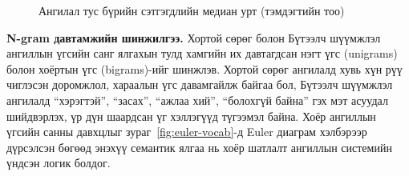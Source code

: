 \begin{figure}[H]
\centering
{}
\caption{Ангилал тус бүрийн сэтгэгдлийн медиан урт (тэмдэгтийн тоо)}
\label{fig:len-dist}
\end{figure}

\textbf{N-gram давтамжийн шинжилгээ.} Хортой сөрөг болон Бүтээлч шүүмжлэл
ангиллын үгсийн санг ялгахын тулд хамгийн их давтагдсан нэгт үгс (unigrams) болон
хоёртын үгс (bigrams)-ийг шинжлэв. Хортой сөрөг ангилалд хувь хүн рүү чиглэсэн
доромжлол, хараалын үгс давамгайлж байгаа бол, Бүтээлч шүүмжлэл ангилалд ``хэрэгтэй'',
``засах'', ``ажлаа хий'', ``болохгүй байна'' гэх мэт асуудал шийдвэрлэх, үр дүн
шаардсан үг хэллэгүүд түгээмэл байна. Хоёр ангиллын үгсийн санны давхцлыг
зураг~\ref{fig:euler-vocab}-д Euler диаграм хэлбэрээр дүрсэлсэн бөгөөд энэхүү
семантик ялгаа нь хоёр шатлалт ангиллын системийн үндсэн логик болдог.

